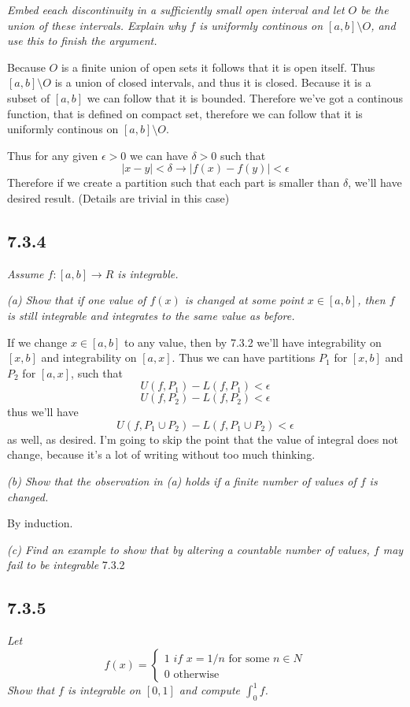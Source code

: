 \documentclass[11pt,oneside,titlepage]{book}
\begin{document}
\textit{Embed eeach discontinuity in a sufficiently small open interval and
  let $O$ be the union of these intervals. Explain why $f$ is uniformly
  continous on $[a, b] \setminus O$, and use this to finish the argument.}

Because $O$ is a finite union of open sets it follows that it is open itself.
Thus $[a, b] \setminus O$ is a union of closed intervals, and thus it is
closed. Because it is a subset of $[a, b]$ we can follow that it is bounded.
Therefore we've got a continous function, that is defined on compact set,
therefore we can follow that it is uniformly continous on
$[a, b] \setminus O$.

Thus for any given $\epsilon > 0$ we can have $\delta > 0$ such
that
$$|x - y| < \delta \to |f(x) - f(y)| < \epsilon$$
Therefore if we create a partition such that each part is smaller than
$\delta$,  we'll have desired result. (Details are trivial in this case)


\subsection*{7.3.4}
\textit{Assume $f: [a, b] \to R$ is integrable.}

\textit{(a) Show that if one value of $f(x)$ is changed at some point
  $x \in [a, b]$, then $f$ is still integrable and integrates to the same
  value as before.}

If we change $x \in [a, b]$ to any value, then by 7.3.2 we'll have
integrability on $[x, b]$ and integrability on $[a, x]$. Thus
we can have partitions $P_1$ for $[x, b]$ and $P_2$ for $[a, x]$,
such that
$$U(f, P_1) - L(f, P_1) < \epsilon$$
$$U(f, P_2) - L(f, P_2) < \epsilon$$
thus we'll have
$$U(f, P_1 \cup P_2) - L(f, P_1 \cup P_2) < \epsilon$$
as well, as desired. I'm going to skip the point that the value of
integral does not change, because it's a lot of writing without too
much thinking.

\textit{(b) Show that the observation in (a) holds if a finite number of
  values of $f$ is changed.}

By induction.

\textit{(c) Find an example to show that by altering a countable number of
  values, $f$ may fail to be integrable}
7.3.2

\subsection*{7.3.5}
\textit{Let }
$$f(x) =
\begin{cases}
  1 \textit{ if } x = 1/n \text{ for some } n \in N \\
  0 \text{ otherwise}
\end{cases}
$$
\textit{Show that $f$ is integrable on $[0, 1]$ and compute $\int_0^1f$.}
\end{document}
